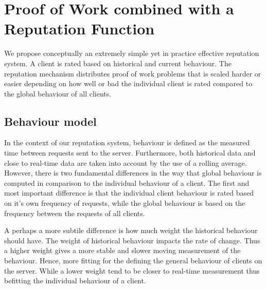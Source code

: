 \section{Proof of Work combined with a Reputation Function}
We propose conceptually an extremely simple yet in practice effective reputation system. A client is rated based on historical and current behaviour. The reputation mechanism distributes proof of work problems that is scaled harder or easier depending on how well or bad the individual client is rated compared to the global behaviour of all clients. 

\subsection{Behaviour model}
In the context of our reputation system, behaviour is defined as the measured time between requests sent to the server. Furthermore, both historical data and close to real-time data are taken into account by the use of a rolling average. However, there is two fundamental differences in the way that global behaviour is computed in comparison to the individual behaviour of a client. The first and most important difference is that the individual client behaviour is rated based on it's own frequency of requests, while the global behaviour is based on the frequency between the requests of all clients. 

A perhaps a more subtile difference is how much weight the historical behaviour should have. The weight of historical behaviour impacts the rate of change. Thus a higher weight gives a more stable and slower moving measurement of the behaviour. Hence, more fitting for the defining the general behaviour of clients on the server. While a lower weight tend to be closer to real-time measurement thus befitting the individual behaviour of a client.